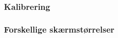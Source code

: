 \begin{frame}
\frametitle{Kalibrering}
\end{frame}

\begin{frame}
\frametitle{Forskellige skærmstørrelser}
\end{frame}
